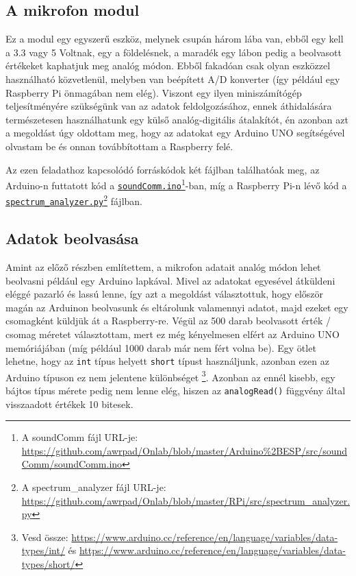 \documentclass[12pt,a4paper]{article}
\begin{document}
    \subsection{A mikrofon modul}
      Ez a modul egy egyszerű eszköz, melynek csupán három lába van, ebből egy kell a 3.3 vagy 5 Voltnak, egy a földelésnek, a maradék egy lábon pedig a beolvasott értékeket kaphatjuk meg analóg módon. Ebből fakadóan csak olyan eszközzel használható közvetlenül, melyben van beépített A/D konverter (így például egy Raspberry Pi önmagában nem elég). Viszont egy ilyen miniszámítógép teljesítményére szükségünk van az adatok feldolgozásához, ennek áthidalására természetesen használhatunk egy külső analóg-digitális átalakítót, én azonban azt a megoldást úgy oldottam meg, hogy az adatokat egy Arduino UNO segítségével olvastam be és onnan továbbítottam a Raspberry felé.

      Az ezen feladathoz kapcsolódó forráskódok két fájlban találhatóak meg, az Arduino-n futtatott kód a \href{https://github.com/awrpad/Onlab/blob/master/Arduino\%2BESP/src/soundComm/soundComm.ino}{\texttt{soundComm.ino}}\footnote{A soundComm fájl URL-je: \url{https://github.com/awrpad/Onlab/blob/master/Arduino\%2BESP/src/soundComm/soundComm.ino}}-ban, míg a Raspberry Pi-n lévő kód a \href{https://github.com/awrpad/Onlab/blob/master/RPi/src/spectrum\_analyzer.py}{\texttt{spectrum\_analyzer.py}}\footnote{A spectrum\_analyzer fájl URL-je: \url{https://github.com/awrpad/Onlab/blob/master/RPi/src/spectrum\_analyzer.py}} fájlban.

    \subsection{Adatok beolvasása}
      Amint az előző részben említettem, a mikrofon adatait analóg módon lehet beolvasni például egy Arduino lapkával. Mivel az adatokat egyesével átküldeni eléggé pazarló és lassú lenne, így azt a megoldást választottuk, hogy először magán az Arduinon beolvasunk és eltárolunk valamennyi adatot, majd ezeket egy csomagként küldjük át a Raspberry-re. Végül az 500 darab beolvasott érték / csomag méretet választottam, mert ez még kényelmesen elfért az Arduino UNO memóriájában (míg például 1000 darab már nem fért volna be). Egy ötlet lehetne, hogy az \texttt{int} típus helyett \texttt{short} típust használjunk, azonban ezen az Arduino típuson ez nem jelentene különbséget \footnote{Vesd össze: \url{https://www.arduino.cc/reference/en/language/variables/data-types/int/} és \url{https://www.arduino.cc/reference/en/language/variables/data-types/short/}}. Azonban az ennél kisebb, egy bájtos típus mérete pedig nem lenne elég, hiszen az \texttt{analogRead()} függvény által visszaadott értékek 10 bitesek.
\end{document}
